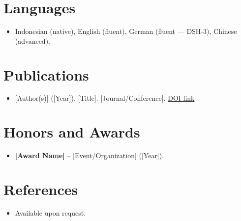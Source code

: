 \documentclass[11pt,a4paper,sans]{moderncv}
\begin{document}

\section{Languages}
\vspace{1pt}
\begin{itemize}
\item {Indonesian (native), English (fluent), German (fluent --- DSH-3), Chinese (advanced).}
\end{itemize}


\section{Publications}
\vspace{1pt}
\begin{itemize}
\item {[Author(s)] ([Year]). [Title]. [Journal/Conference]. \href{[DOI_URL]}{DOI link}}
\end{itemize}


\section{Honors and Awards}
\vspace{1pt}
\begin{itemize}
\item{\textbf{[Award Name]} -- [Event/Organization] ([Year]).}
\end{itemize}


\section{References}
\vspace{1pt}
\begin{itemize}
\item{Available upon request.}
\end{itemize}
\end{document}
